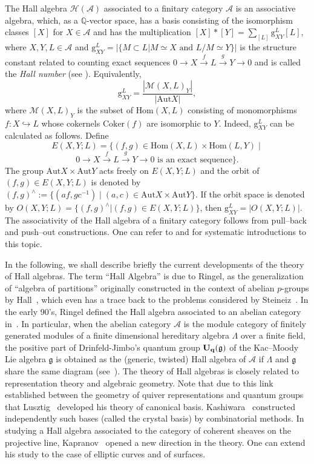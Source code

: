\documentclass{amsart}
\theoremstyle{definition}
\numberwithin{equation}{section}
\begin{document}
The Hall algebra $\mathcal{H}(\mathcal{A})$ associated to a finitary
category $\mathcal{A}$ is an associative algebra, which, as a
${{\mathbb Q}}$-vector space, has a basis consisting of the isomorphism
classes $[X]$ for $X\in \mathcal{A}$ and has the multiplication
$[X]*[Y]=\sum_{[L]}\mathrm{g}_{XY}^L[L]$, where $X,Y,L \in
\mathcal{A}$ and $\mathrm{g}_{XY}^L=|\{ M \subset L| M \simeq X
\text{ and } L/M \simeq Y\}|$ is the structure constant related to
counting exact sequences $0 \rightarrow X \xrightarrow{f} L
\xrightarrow{g}Y \rightarrow 0$ and is called the \emph{Hall number}
(see \cite{Joyce}). Equivalently,
$$\mathrm{g}_{XY}^L=\displaystyle\frac{|\mathcal{M}(X,L)_{Y}|}{|{\mbox{Aut}} X|},$$ where $\mathcal{M}(X,L)_{Y}$ is the subset of
$\textrm{Hom}(X,L)$ consisting of monomorphisms $f: X
\hookrightarrow L$ whose cokernels $\textrm{Coker}(f)$ are
isomorphic to $Y$. Indeed, $\mathrm{g}_{XY}^L$ can be calculated as
follows. Define $$ E(X,Y;L)=\{(f,g)\in {\mathrm{Hom}}(X,L)\times {\mathrm{Hom}}(L,Y)\mid
$$ $$ 0 \rightarrow X \xrightarrow{f} L \xrightarrow{g}Y \rightarrow
0 \mbox{ is an exact sequence}\}.$$ The group ${\mbox{Aut}} X\times {\mbox{Aut}} Y$
acts freely on $E(X,Y;L)$ and the orbit of $(f,g)\in E(X,Y;L)$ is
denoted by $(f,g)^{\wedge}:=\{(af,gc^{-1})\mid (a,c)\in {\mbox{Aut}} X\times
{\mbox{Aut}} Y\}.$ If the orbit space is denoted by $O(X,Y;L)=\{
(f,g)^{\wedge}|(f,g) \in E(X,Y;L)\}$, then
$\mathrm{g}_{XY}^L=|O(X,Y;L)|$. The associativity of the Hall
algebra of a finitary category follows from pull--back and push--out
constructions. One can refer to \cite{Schiffmann1} and
\cite{Schiffmann2} for systematic introductions to this topic.

In the following, we shall describe briefly the current developments
of the theory of Hall algebras. The term ``Hall Algebra'' is due to
Ringel, as the generalization of ``algebra of partitions''
originally constructed in the context of abelian $p$-groups by
Hall~\cite{Hall}, which even has a trace back to the problems
considered by Steineiz~\cite{Steinitz}. In the early 90's, Ringel
defined the Hall algebra associated to an abelian category
in~\cite{Ringel1990}. In particular, when the abelian category
$\mathcal{A}$ is the module category of finitely generated modules
of a finite dimensional hereditary algebra $\Lambda$ over a finite
field, the positive part of Drinfeld-Jimbo's quantum group $\bf{U}_q
(\mathfrak{g})$ of the Kac--Moody Lie algebra $\mathfrak{g}$ is
obtained as the (generic, twisted) Hall algebra of $\mathcal{A}$ if
$\Lambda$ and $\mathfrak{g}$ share the same diagram
(see~\cite{Ringel1990,Green}). The theory of Hall algebras is
closely related to representation theory and algebraic geometry.
Note that due to this link established between the geometry of
quiver representations and quantum groups that
Lusztig~\cite{Lusztig} developed his theory of canonical basis.
Kashiwara~\cite{Kashiwara} constructed independently such bases
(called the crystal basis) by combinatorial methods. In studying a
Hall algebra associated to the category of coherent sheaves on the
projective line, Kapranov~\cite{Kap1} opened a new direction in the
theory. One can extend his study to the case of elliptic curves and
of surfaces.
\end{document}
